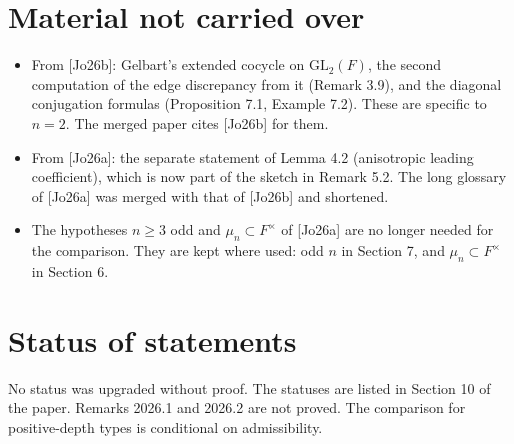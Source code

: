 \documentclass[12pt,letterpaper]{article}
\begin{document}
\section{Material not carried over}
\begin{itemize}[leftmargin=2em]
\item From [Jo26b]: Gelbart's extended cocycle on $\mathrm{GL}_2(F)$, the second computation of the edge discrepancy from it (Remark 3.9), and the diagonal conjugation formulas (Proposition 7.1, Example 7.2). These are specific to $n=2$. The merged paper cites [Jo26b] for them.
\item From [Jo26a]: the separate statement of Lemma 4.2 (anisotropic leading coefficient), which is now part of the sketch in Remark 5.2. The long glossary of [Jo26a] was merged with that of [Jo26b] and shortened.
\item The hypotheses $n\ge3$ odd and $\mu_n\subset F^\times$ of [Jo26a] are no longer needed for the comparison. They are kept where used: odd $n$ in Section 7, and $\mu_n\subset F^\times$ in Section 6.
\end{itemize}

\section{Status of statements}
No status was upgraded without proof. The statuses are listed in Section 10 of the paper. Remarks 2026.1 and 2026.2 are not proved. The comparison for positive-depth types is conditional on admissibility.
\end{document}
